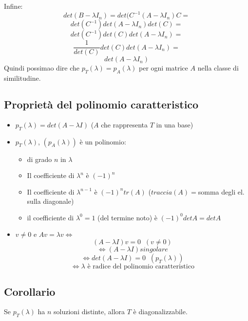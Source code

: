 Infine:
\[det(B-\lambda I_n)=det(C^{-1}(A-\lambda I_n)C=\]
\[det(C^{-1})det(A-\lambda I_n)det(C)=\]
\[det(C^{-1})det(C)det(A-\lambda I_n)=\]
\[\frac{1}{det(C)}det(C)det(A-\lambda I_n)=\]
\[det(A-\lambda I_n)\]
Quindi possimao dire che $p_T(\lambda)=p_A(\lambda)$ per ogni matrice $A$ nella classe di similitudine.

\subsection{Proprietà del polinomio caratteristico}
\begin{itemize}

\item $p_T(\lambda)=det(A-\lambda I)$ ($A$ che rappresenta $T$ in una base)

\item $p_T(\lambda)$, $(p_A(\lambda))$ è un polinomio:
  \begin{itemize}
  \item di grado $n$ in $\lambda $
  \item Il coefficiente di $\lambda ^n$ è $(-1)^n$
  \item Il coefficiente di $\lambda^{n-1}$ è $(-1)^ntr(A)$ ($traccia(A)=$somma degli el. sulla diagonale)
  \item il coefficiente di $\lambda ^0=1$ (del termine noto) è $(-1)^0detA=detA$
  \end{itemize}

\item $v\neq 0$ e $Av=\lambda v \Leftrightarrow$
  \[(A-\lambda I)v=0\;\;(v\neq 0)\]
  \[\Leftrightarrow (A-\lambda I)singolare\]
  \[\Leftrightarrow det(A-\lambda I)=0\;\;(p_T(\lambda))\]
  \[\Leftrightarrow\lambda\text{ è radice del polinomio caratteristico}\]

\end{itemize}

\subsection{Corollario}
Se $p_T(\lambda)$ ha $n$ soluzioni distinte, allora $T$ è diagonalizzabile.

